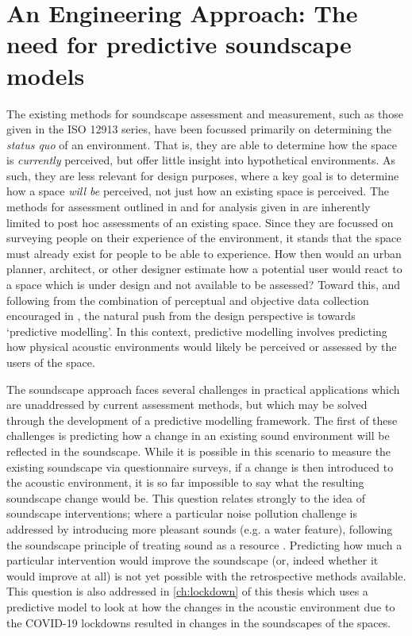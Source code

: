 \section{An Engineering Approach: The need for predictive soundscape models}
\label{sec:NeedForPredModels}

The existing methods for soundscape assessment and measurement, such as those given in the ISO 12913 series, have been focussed primarily on determining the \emph{status quo} of an environment. That is, they are able to determine how the space is \emph{currently} perceived, but offer little insight into hypothetical environments. As such, they are less relevant for design purposes, where a key goal is to determine how a space \emph{will be} perceived, not just how an existing space is perceived. The methods for assessment outlined in \citet{ISO12913Part2} and for analysis given in \citet{ISO12913Part3} are inherently limited to post hoc assessments of an existing space. Since they are focussed on surveying people on their experience of the environment, it stands that the space must already exist for people to be able to experience. How then would an urban planner, architect, or other designer estimate how a potential user would react to a space which is under design and not available to be assessed? Toward this, and following from the combination of perceptual and objective data collection encouraged in \citet{ISO12913Part2}, the natural push from the design perspective is towards `predictive modelling'. In this context, predictive modelling involves predicting how physical acoustic environments would likely be perceived or assessed by the users of the space. 

The soundscape approach faces several challenges in practical applications which are unaddressed by current assessment methods, but which may be solved through the development of a predictive modelling framework. The first of these challenges is predicting how a change in an existing sound environment will be reflected in the soundscape. While it is possible in this scenario to measure the existing soundscape via questionnaire surveys, if a change is then introduced to the acoustic environment, it is so far impossible to say what the resulting soundscape change would be. This question relates strongly to the idea of soundscape interventions; where a particular noise pollution challenge is addressed by introducing more pleasant sounds (e.g. a water feature), following the soundscape principle of treating sound as a resource \citep{Lavia2016Soundscape}. Predicting how much a particular intervention would improve the soundscape (or, indeed whether it would improve at all) is not yet possible with the retrospective methods available. This question is also addressed in \cref{ch:lockdown} of this thesis which uses a predictive model to look at how the changes in the acoustic environment due to the COVID-19 lockdowns resulted in changes in the soundscapes of the spaces.

